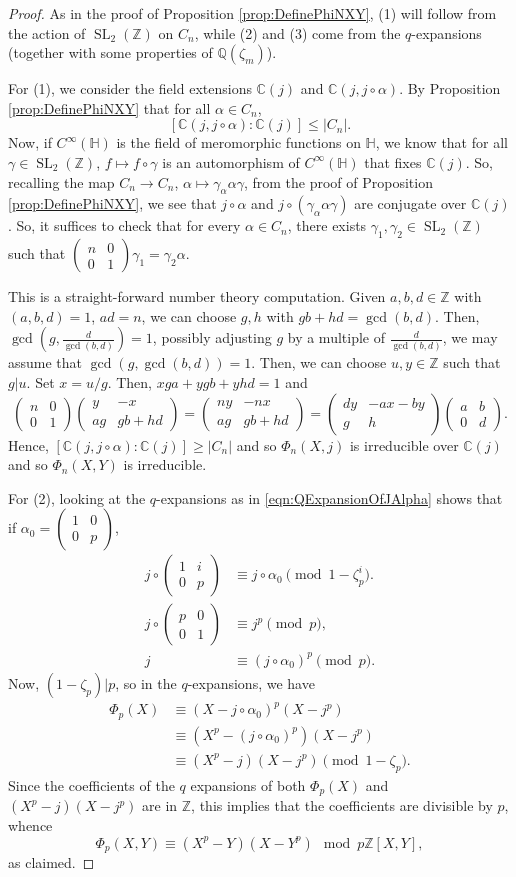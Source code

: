 \documentclass{amsart}
\theoremstyle{definition}
\theoremstyle{remark}
\numberwithin{equation}{section}
\newcommand{\bbC}{\mathbb C}
\newcommand{\bbH}{\mathbb H}
\newcommand{\bbQ}{\mathbb Q}
\newcommand{\bbZ}{\mathbb Z}
\newcommand{\twobytwo}[4]{\left(\begin{array}{cc} #1 & #2 \\ #3 & #4\end{array} \right)}
\DeclareMathOperator{\SL}{SL}
\begin{document}
\begin{proof}
As in the proof of Proposition \ref{prop:DefinePhiNXY}, (1) will follow from the action of $\SL_{2}(\bbZ)$ on $C_{n}$, while (2) and (3) come from the $q$-expansions (together with some properties of $\bbQ(\zeta_{m})$).

For (1), we consider the field extensions $\bbC(j)$ and $\bbC(j, j \circ \alpha)$. By Proposition \ref{prop:DefinePhiNXY} that for all $\alpha \in C_{n}$, 
\[
[\bbC(j, j \circ \alpha): \bbC(j)] \leq |C_{n}|.
\]
Now, if $C^{\infty}(\bbH)$ is the field of meromorphic functions on $\bbH$, we know that for all $\gamma \in \SL_{2}(\bbZ)$, $f \mapsto f \circ \gamma$ is an automorphism of $C^{\infty}(\bbH)$ that fixes $\bbC(j)$. So, recalling the map $C_{n} \to C_{n}$, $\alpha \mapsto \gamma_{\alpha} \alpha \gamma$, from the proof of Proposition \ref{prop:DefinePhiNXY}, we see that $j\circ \alpha$ and $j \circ (\gamma_{\alpha} \alpha \gamma)$ are conjugate over $\bbC(j)$. 
So, it suffices to check that for every $\alpha \in C_{n}$, there exists $\gamma_{1}, \gamma_{2} \in \SL_{2}(\bbZ)$ such that $\twobytwo{n}{0}{0}{1} \gamma_{1} = \gamma_{2} \alpha$.

This is a straight-forward number theory computation. Given $a,b,d \in \bbZ$ with $(a,b,d) = 1$, $ad = n$, we can choose $g, h$ with $g b + h d = \gcd(b,d)$. Then, $\gcd\left( g, \frac{d}{\gcd(b,d)}\right) = 1$, possibly adjusting $g$ by a multiple of $\frac{d}{\gcd(b,d)}$, we may assume that $\gcd(g, \gcd(b,d)) = 1$. Then, we can choose $u,y \in \bbZ$ such that $g|u$. Set $x = u/g$. Then, $xga + ygb + yhd = 1$ and 
\[
\twobytwo{n}{0}{0}{1} \twobytwo{y}{-x}{ag}{gb + hd} = \twobytwo{ny}{-nx}{ag}{gb + hd} = \twobytwo{dy}{-ax-by}{g}{h} \twobytwo{a}{b}{0}{d}.
\]
Hence, $[\bbC(j, j \circ \alpha): \bbC(j)] \geq |C_{n}|$ and so $\Phi_{n}(X,j)$ is irreducible over $\bbC(j)$ and so $\Phi_{n}(X,Y)$ is irreducible.

For (2), looking at the $q$-expansions as in \eqref{eqn:QExpansionOfJAlpha} shows that if $\alpha_{0} = \twobytwo{1}{0}{0}{p}$, 
\begin{align*}
j \circ \twobytwo{1}{i}{0}{p} & \equiv j \circ \alpha_{0} \pmod{1 - \zeta_{p}^i}.\\
j \circ \twobytwo{p}{0}{0}{1} & \equiv j^p \pmod{p},\\
 j & \equiv (j \circ \alpha_{0})^p \pmod{p}.
\end{align*}
Now, $(1-\zeta_{p})|p$, so in the $q$-expansions, we have 
\begin{align*}
\Phi_p(X) & \equiv (X - j \circ \alpha_{0})^p (X - j^p) \\
          & \equiv (X^p - (j \circ \alpha_{0})^p)(X - j^p) \\
          & \equiv (X^p - j)(X - j^p) \pmod{1 - \zeta_{p}}.
\end{align*}
Since the coefficients of the $q$ expansions of both $\Phi_{p}(X)$ and $(X^p - j)(X - j^p)$ are in $\bbZ$, this implies that the coefficients are divisible by $p$, whence
\[
 \Phi_{p}(X,Y) \equiv (X^p - Y)(X - Y^p) \mod p\bbZ[X,Y],
\]
as claimed.


\end{proof}
\end{document}

